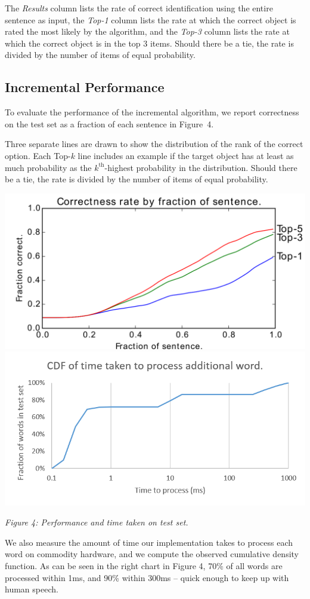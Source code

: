 \documentclass[landscape,a0b]{a0poster}
\numberwithin{equation}{section}
\begin{document}
\begin{multicols*}{3}
The \emph{Results} column lists the rate of correct identification using the entire sentence as input, the \emph{Top-1} column lists the rate at which the correct object is rated the most likely by the algorithm, and the \emph{Top-3} column lists the rate at which the correct object is in the top 3 items. Should there be a tie, the rate is divided by the number of items of equal probability.

\subsection{Incremental Performance}

To evaluate the performance of the incremental algorithm, we report correctness on the test set as a fraction of each sentence in Figure~4.

Three separate lines are drawn to show the distribution of the rank of the correct option. Each Top-$k$ line includes an example if the target object has at least as much probability as the $k^\text{th}$-highest probability in the distribution. Should there be a tie, the rate is divided by the number of items of equal probability.


\begin{center}
  \includegraphics[width=0.45\columnwidth]{eval/cdf_by_fraction}
  \includegraphics[width=0.45\columnwidth]{time_inc}
  
  \textit{Figure 4: Performance and time taken on test set.}
\end{center}

We also measure the amount of time our implementation takes to process each word on commodity hardware, and we compute the observed cumulative density function. As can be seen in the right chart in Figure 4, 70\% of all words are processed within 1ms, and 90\% within 300ms -- quick enough to keep up with human speech.



\end{multicols*}
\end{document}
